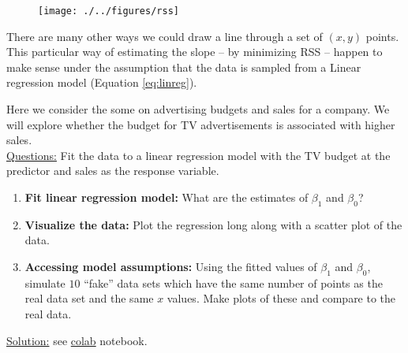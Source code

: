 \begin{figure}[h]
\centering
\texttt{[image: ./../figures/rss]}
\caption{ }\label{rss}
\end{figure}


There are many other ways we could draw a line through a set of $(x,y)$ points. This particular way of estimating the slope -- by minimizing RSS -- happen to make sense under the assumption that  the data is sampled from a Linear regression model (Equation \ref{eq:linreg}). 



\begin{example}
Here we consider the some on advertising budgets and sales for a company. We will explore whether the budget for TV advertisements is associated with higher sales. \\

 \noindent
\underline{Questions:} Fit the data to a linear regression model with the TV budget at the  predictor and sales as the response variable. 
\begin{enumerate}[label=(\alph*)]
\item {\bf Fit linear regression model:} What are the estimates of $\beta_1$ and $\beta_0$? 
\item {\bf Visualize the data:} Plot the regression long along with a scatter plot of the data. 
\item {\bf Accessing model assumptions:} Using the fitted values of $\beta_1$ and $\beta_0$, simulate $10$ ``fake'' data sets which have the same number of points as the real data set and the same $x$ values.  Make plots of these and compare to the real data.  \\
\end{enumerate}

 \noindent
\underline{Solution:} see \href{https://colab.research.google.com/drive/1_4zOruAWfJ3HQoIf9sjefk3z0APko94-?usp=sharing}{colab} notebook. 
\end{example}




